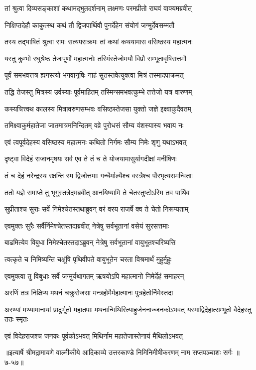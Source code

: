 
\twolineshloka
{तां श्रुत्वा दिव्यसङ्काशां कथामद्भुतदर्शनाम्}
{लक्ष्मणः परमप्रीतो राघवं वाक्यमब्रवीत्} %

\twolineshloka
{निक्षिप्तदेहौ काकुत्स्थ कथं तौ द्विजपार्थिवौ}
{पुनर्देहेन संयोगं जग्मुर्देवसम्मतौ} %

\twolineshloka
{तस्य तद्भाषितं श्रुत्वा रामः सत्यपराक्रमः}
{तां कथां कथयामास वसिष्ठस्य महात्मनः} %

\twolineshloka
{यस्तु कुम्भो रघुश्रेष्ठ तेजःपूर्णो महात्मनोः}
{तस्मिंस्तेजोमयौ विप्रौ सम्भूतावृषिसत्तमौ} %

\twolineshloka
{पूर्वं समभवत्तत्र ह्यगस्त्यो भगवानृषिः}
{नाहं सुतस्तवेत्युक्त्वा मित्रं तस्मादपाक्रमत्} %

\twolineshloka
{तद्धि तेजस्तु मित्रस्य उर्वस्याः पूर्वमाहितम्}
{तस्मिन्समभवत्कुम्भे तत्तेजो यत्र वारुणम्} %

\twolineshloka
{कस्यचित्त्वथ कालस्य मित्रावरुणसम्भवः}
{वसिष्ठस्तेजसा युक्तो जज्ञे इक्ष्वाकुदैवतम्} %

\twolineshloka
{तमिक्ष्वाकुर्महातेजा जातमात्रमनिन्दितम्}
{वव्रे पुरोधसं सौम्य वंशस्यास्य भवाय नः} %

\twolineshloka
{एवं त्वपूर्वदेहस्य वसिष्ठस्य महात्मनः}
{कथितो निर्गमः सौम्य निमेः शृणु यथाऽभवत्} %

\twolineshloka
{दृष्ट्वा विदेहं राजानमृषयः सर्व एव ते}
{तं च ते योजयामासुर्यागदीक्षां मनीषिणः} %

\twolineshloka
{तं च देहं नरेन्द्रस्य रक्षन्ति स्म द्विजोत्तमाः}
{गन्धैर्माल्यैश्च वस्त्रैश्च पौरभृत्यसमन्विताः} %

\twolineshloka
{ततो यज्ञे समाप्ते तु भृगुस्तत्रेदमब्रवीत्}
{आनयिष्यामि ते चेतस्तुष्टोऽस्मि तव पार्थिव} %

\twolineshloka
{सुप्रीताश्च सुराः सर्वे निमेश्चेतस्तथाब्रुवन्}
{वरं वरय राजर्षे क्व ते चेतो निरूप्यताम्} %

\twolineshloka
{एवमुक्तः सुरैः सर्वैर्निमेश्चेतस्तदाब्रवीत्}
{नेत्रेषु सर्वभूतानां वसेयं सुरसत्तमाः} %

\twolineshloka
{बाढमित्येव विबुधा निमेश्चेतस्तदाऽब्रुवन्}
{नेत्रेषु सर्वभूतानां वायुभूतश्चरिष्यसि} %

\twolineshloka
{त्वत्कृते च निमिष्यन्ति चक्षूंषि पृथिवीपते}
{वायुभूतेन चरता विश्रमार्थं मुहुर्मुहुः} %

\twolineshloka
{एवमुक्त्वा तु विबुधाः सर्वे जग्मुर्यथागतम्}
{ऋषयोऽपि महात्मानो निमेर्देहं समाहरन्} %

\twolineshloka
{अरणिं तत्र निक्षिप्य मथनं चक्रुरोजसा}
{मन्त्रहोमैर्महात्मानः पुत्रहेतोर्निमेस्तदा} %

\threelineshloka
{अरण्यां मथ्यामानायां प्रादुर्भूतो महातपाः}
{मथनान्मिथिरित्याहुर्जननाज्जनकोऽभवत्}
{यस्माद्विदेहात्सम्भूतो वैदेहस्तु ततः स्मृतः} %

\twolineshloka
{एवं विदेहराजश्च जनकः पूर्वकोऽभवत्}
{मिथिर्नाम महातेजास्तेनायं मैथिलोऽभवत्} %


॥इत्यार्षे श्रीमद्रामायणे वाल्मीकीये आदिकाव्ये उत्तरकाण्डे निमिनिमीषीकरणम् नाम सप्तपञ्चाशः सर्गः ॥७-५७॥

